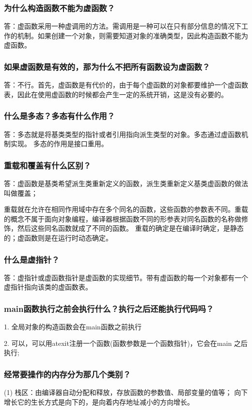 \documentclass[UTF8]{ctexart}
\begin{document}
\subsubsection{为什么构造函数不能为虚函数？}
答：虚函数采用一种虚调用的方法。需调用是一种可以在只有部分信息的情况下工作的机制。如果创建一个对象，则需要知道对象的准确类型，因此构造函数不能为虚函数。 \par

\subsubsection{如果虚函数是有效的，那为什么不把所有函数设为虚函数？}
答：不行。首先，虚函数是有代价的，由于每个虚函数的对象都要维护一个虚函数表，因此在使用虚函数的时候都会产生一定的系统开销，这是没有必要的。
\subsubsection{什么是多态？多态有什么作用？}
答：多态就是将基类类型的指针或者引用指向派生类型的对象。多态通过虚函数机制实现。
多态的作用是接口重用。
\subsubsection{重载和覆盖有什么区别？}
答：虚函数是基类希望派生类重新定义的函数，派生类重新定义基类虚函数的做法叫做覆盖；\par
重载就在允许在相同作用域中存在多个同名的函数，这些函数的参数表不同。重载的概念不属于面向对象编程，编译器根据函数不同的形参表对同名函数的名称做修饰，然后这些同名函数就成了不同的函数。
重载的确定是在编译时确定，是静态的；虚函数则是在运行时动态确定。
\subsubsection{什么是虚指针？}
答：虚指针或虚函数指针是虚函数的实现细节。带有虚函数的每一个对象都有一个虚指针指向该类的虚函数表。
\subsubsection{main函数执行之前会执行什么？执行之后还能执行代码吗？}
1. 全局对象的构造函数会在main函数之前执行 \par
2. 可以，可以用atexit注册一个函数(函数参数是一个函数指针)，它会在main 之后执行; \par
\subsubsection{经常要操作的内存分为那几个类别？}
(1) 栈区：由编译器自动分配和释放，存放函数的参数值、局部变量的值等； 向下增长它的生长方式是向下的，是向着内存地址减小的方向增长。
\end{document}
